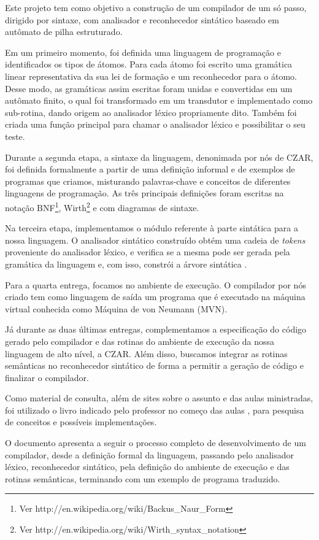 
Este projeto tem como objetivo a construção de um compilador de um só passo, dirigido por sintaxe, com analisador e reconhecedor sintático baseado em autômato de pilha estruturado.

Em um primeiro momento, foi definida uma linguagem de programação e identificados os tipos de átomos. Para cada átomo foi escrito uma gramática linear representativa da sua lei de formação e um reconhecedor para o átomo. Desse modo, as gramáticas assim escritas foram unidas e convertidas em um autômato finito, o qual foi transformado em um transdutor e implementado como sub-rotina, dando origem ao analisador léxico propriamente dito. Também foi criada uma função principal para chamar o analisador léxico e possibilitar o seu teste.

Durante a segunda etapa, a sintaxe da linguagem, denonimada por nós de CZAR, foi definida formalmente a partir de uma definição informal e de exemplos de programas que criamos, misturando palavras-chave e conceitos de diferentes linguagens de programação. As três principais definições foram escritas na notação BNF\footnote{Ver http://en.wikipedia.org/wiki/Backus\_Naur\_Form}, Wirth\footnote{Ver http://en.wikipedia.org/wiki/Wirth\_syntax\_notation} e com diagramas de sintaxe.

Na terceira etapa, implementamos o módulo referente à parte sintática para a nossa linguagem. O analisador sintático construído obtém uma cadeia de \emph{tokens} proveniente do analisador léxico, e verifica se a mesma pode ser gerada pela gramática da linguagem e, com isso, constrói a árvore sintática \cite{alfred1986compilers}.

Para a quarta entrega, focamos no ambiente de execução. O compilador por nós criado tem como linguagem de saída um programa que é executado na máquina virtual conhecida como Máquina de von Neumann (MVN).

Já durante as duas últimas entregas, complementamos a especificação do código gerado pelo compilador e das rotinas do ambiente de execução da nossa linguagem de alto nível, a CZAR. Além disso, buscamos integrar as rotinas semânticas no reconhecedor sintático de forma a permitir a geração de código e finalizar o compilador.

Como material de consulta, além de sites sobre o assunto e das aulas ministradas, foi utilizado o livro indicado pelo professor no começo das aulas \cite{intro-compiladores}, para pesquisa de conceitos e possíveis implementações.

O documento apresenta a seguir o processo completo de desenvolvimento de um compilador, desde a definição formal da linguagem, passando pelo analisador léxico, reconhecedor sintático, pela definição do ambiente de execução e das rotinas semânticas, terminando com um exemplo de programa traduzido.
